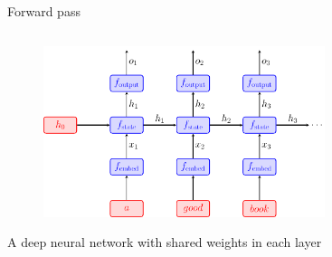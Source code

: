 \documentclass[usenames,dvipsnames,notes,11pt,aspectratio=169,hyperref={colorlinks=true, linkcolor=blue}]{beamer}
\newcommand{\pdfnote}[1]{}
\begin{document}
\begin{frame}
    {Forward pass}
    \begin{columns}
        \begin{column}{0.6\columnwidth}
    \begin{figure}
        \includegraphics[height=5cm]{figures/rnn}
    \end{figure}
        A deep neural network with shared weights in each layer
        \end{column}
    \end{columns}
    \pdfnote{
        The recurrent unit has two learnable matrices to combine prev state and input.
    }
    \pdfnote{
        The output o is a real vector, and we can take that as a feature vector of each word with the left context,
        which can be then used to predict the next word.
    }
\end{frame}
\end{document}
